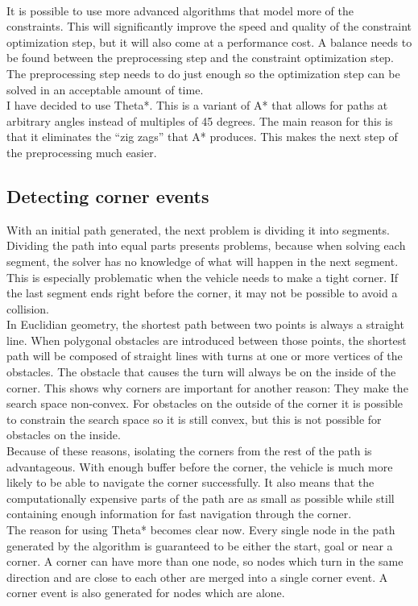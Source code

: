 \\
It is possible to use more advanced algorithms that model more of the constraints. This will significantly improve the speed and quality of the constraint optimization step, but it will also come at a performance cost. A balance needs to be found between the preprocessing step and the constraint optimization step. The preprocessing step needs to do just enough so the optimization step can be solved in an acceptable amount of time. 
\\
I have decided to use Theta*. This is a variant  of A* that allows for paths at arbitrary angles instead of multiples of 45 degrees. The main reason for this is that it eliminates the ``zig zags'' that A* produces. This makes the next step of the preprocessing much easier.\\
\subsection{Detecting corner events}
With an initial path generated, the next problem is dividing it into segments. Dividing the path into equal parts presents problems, because when solving each segment, the solver has no knowledge of what will happen in the next segment. This is especially problematic when the vehicle needs to make a tight corner. If the last segment ends right before the corner, it may not be possible to avoid a collision.\\
In Euclidian geometry, the shortest path between two points is always a straight line. When polygonal obstacles are introduced between those points, the shortest path will be composed of straight lines with turns at one or more vertices of the obstacles. The obstacle that causes the turn will always be on the inside of the corner. This shows why corners are important for another reason: They make the search space non-convex. For obstacles on the outside of the corner it is possible to constrain the search space so it is still convex, but this is not possible for obstacles on the inside.\\
Because of these reasons, isolating the corners from the rest of the path is advantageous. With enough buffer before the corner, the vehicle is much more likely to be able to navigate the corner successfully. It also means that the computationally expensive parts of the path are as small as possible while still containing enough information for fast navigation through the corner.
\\
The reason for using Theta* becomes clear now. Every single node in the path generated by the algorithm is guaranteed to be either the start, goal or near a corner. A corner can have more than one node, so nodes which turn in the same direction and are close to each other are merged into a single corner event. A corner event is also generated for nodes which are alone.

